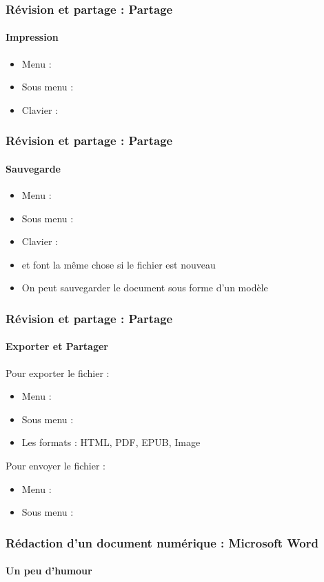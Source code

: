 \documentclass[xcolor=table]{beamer}
\begin{document}
\begin{frame}
\frametitle{Révision et partage : Partage}
\framesubtitle{Impression}

\begin{minipage}{0.30\textwidth}
\begin{itemize}
\item Menu : 
\item Sous menu : 
\item Clavier : 
\end{itemize}
\end{minipage}
\begin{minipage}{0.69\textwidth}
\end{minipage}

\end{frame}

\begin{frame}
\frametitle{Révision et partage : Partage}
\framesubtitle{Sauvegarde}

\begin{itemize}
\item Menu : 
\item Sous menu : 
\item Clavier : 
\item {} et  font la même chose si le fichier est nouveau 
\item On peut sauvegarder le document sous forme d'un modèle 
\end{itemize}


\end{frame}

\begin{frame}
\frametitle{Révision et partage : Partage}
\framesubtitle{Exporter et Partager}

Pour exporter le fichier :
\begin{itemize}
	\item Menu : 
	\item Sous menu : 
	\item Les formats : HTML, PDF, EPUB, Image 
\end{itemize}

Pour envoyer le fichier :
\begin{itemize}
	\item Menu : 
	\item Sous menu : 
\end{itemize}

\end{frame}

\begin{frame}
\frametitle{Rédaction d'un document numérique : Microsoft Word}
\framesubtitle{Un peu d'humour}

\begin{center}
\end{center}

\end{frame}

\end{document}
